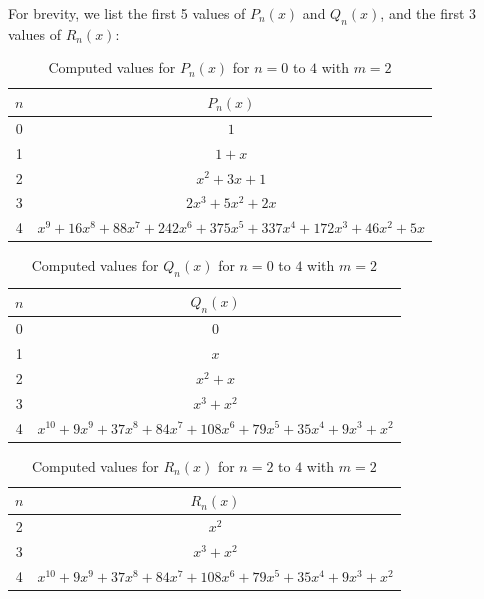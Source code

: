 \documentclass[10pt]{amsart}
\theoremstyle{definition}
\begin{document}
\begin{appendix}
	For brevity, we list the first 5 values of $P_n(x)$ and $Q_n(x)$, and the first 3 values of $R_n(x)$:

	\begin{table}[h]
		\centering
		\begin{tabular}{c|c}
			\hline
			$n$ & $P_n(x)$                                                               \\
			\hline
			0   & $1$                                                                    \\
			1   & $1 + x$                                                                \\
			2   & $x^2 + 3x + 1$                                                         \\
			3   & $2x^3 + 5x^2 + 2x$                                                     \\
			4   & $x^9 + 16x^8 + 88x^7 + 242x^6 + 375x^5 + 337x^4 + 172x^3 + 46x^2 + 5x$ \\
			\hline
		\end{tabular}
		\caption{Computed values for $P_n(x)$ for $n=0$ to $4$ with $m=2$}
		\label{tab:values_P}
	\end{table}

	\begin{table}[h]
		\centering
		\begin{tabular}{c|c}
			\hline
			$n$ & $Q_n(x)$                                                              \\
			\hline
			0   & $0$                                                                   \\
			1   & $x$                                                                   \\
			2   & $x^2 + x$                                                             \\
			3   & $x^3 + x^2$                                                           \\
			4   & $x^{10} + 9x^9 + 37x^8 + 84x^7 + 108x^6 + 79x^5 + 35x^4 + 9x^3 + x^2$ \\
			\hline
		\end{tabular}
		\caption{Computed values for $Q_n(x)$ for $n=0$ to $4$ with $m=2$}
		\label{tab:values_Q}
	\end{table}

	\begin{table}[h]
		\centering
		\begin{tabular}{c|c}
			\hline
			$n$ & $R_n(x)$                                                              \\
			\hline
			2   & $x^2$                                                                 \\
			3   & $x^3 + x^2$                                                           \\
			4   & $x^{10} + 9x^9 + 37x^8 + 84x^7 + 108x^6 + 79x^5 + 35x^4 + 9x^3 + x^2$ \\
			\hline
		\end{tabular}
		\caption{Computed values for $R_n(x)$ for $n=2$ to $4$ with $m=2$}
		\label{tab:values_R}
	\end{table}
\end{appendix}
\end{document}
